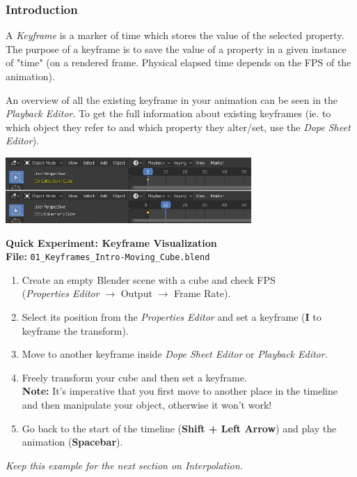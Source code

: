 \documentclass{article}
\begin{document}
\subsubsection{Introduction}
A \textit{Keyframe} is a marker of time which stores the value of the selected property.\\
The purpose of a keyframe is to save the value of a property in a given instance of "time" (on a rendered frame. Physical elapsed time depends on the FPS of the animation).\par

An overview of all the existing keyframe in your animation can be seen in the \textit{Playback Editor}. To get the full information about existing keyframes (ie. to which
object they refer to and which property they alter/set, use the \textit{Dope Sheet Editor}).
\begin{center}
    \includegraphics[width=0.7\textwidth]{blender_docs_images/animation_keyframes_introduction_visualization.png}
\end{center}
\begin{mdframed}[linewidth=2pt, linecolor=gray, roundcorner=1pt, innermargin=2pt, outermargin=2pt]
    \textbf{\Large Quick Experiment: Keyframe Visualization} \\[6pt]
    \textbf{File:} \texttt{01\_Keyframes\_Intro-Moving\_Cube.blend} \\[6pt]

    \begin{enumerate}[topsep=0pt, noitemsep]
        \item Create an empty Blender scene with a cube and check FPS \\
              (\textit{Properties Editor} $\rightarrow$ Output $\rightarrow$ Frame Rate).
        \item Select its position from the \textit{Properties Editor} and set a keyframe (\textbf{I} to keyframe the transform).
        \item Move to another keyframe inside \textit{Dope Sheet Editor} or \textit{Playback Editor}.
        \item Freely transform your cube and then set a keyframe. \\
              \textbf{Note:} It's imperative that you first move to another place in the timeline and then manipulate your object, otherwise it won't work!
        \item Go back to the start of the timeline (\textbf{Shift + Left Arrow}) and play the animation (\textbf{Spacebar}).
    \end{enumerate}

    \textit{Keep this example for the next section on Interpolation.}
\end{mdframed}
\end{document}
